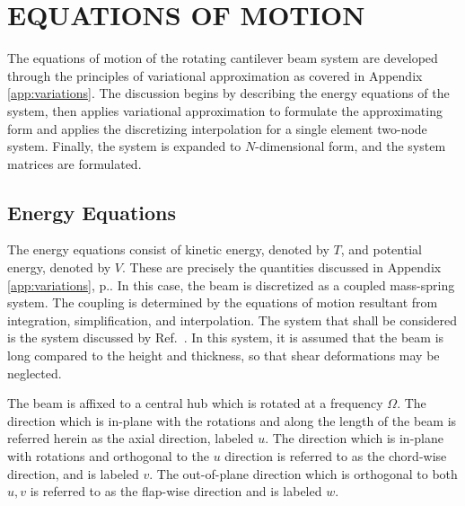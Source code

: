 
%

\chapter{EQUATIONS OF MOTION}
\label{chap:eom}
The equations of motion of the rotating cantilever beam system are developed through the principles of variational approximation as covered in Appendix \ref{app:variations}. The discussion begins by describing the energy equations of the system, then applies variational approximation to formulate the approximating form and applies the discretizing interpolation for a single element two-node system. Finally, the system is expanded to $N$-dimensional form, and the system matrices are formulated. 

\section{Energy Equations}

The energy equations consist of kinetic energy, denoted by $T$, and potential energy, denoted by $V$. These are precisely the quantities discussed in Appendix \ref{app:variations}, p.\pageref{app:variations}. In this case, the beam is discretized as a coupled mass-spring system. The coupling is determined by the equations of motion resultant from integration, simplification, and interpolation. The system that shall be considered is the system discussed by Ref.~\cite{chung2002dynamic}. In this system, it is assumed that the beam is long compared to the height and thickness, so that shear deformations may be neglected. 

The beam is affixed to a central hub which is rotated at a frequency $\Omega$. The direction which is in-plane with the rotations and along the length of the beam is referred herein as the axial direction, labeled $u$. The direction which is in-plane with rotations and orthogonal to the $u$ direction is referred to as the chord-wise direction, and is labeled $v$. The out-of-plane direction which is orthogonal to both $u,v$ is referred to as the flap-wise direction and is labeled $w$.

